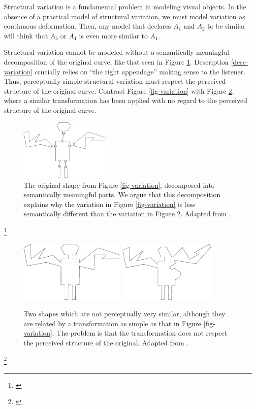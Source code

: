 Structural variation is a fundamental problem in modeling visual
objects. In the absence of a practical model of structural variation,
we must model variation as continuous deformation. Then, any model
that declares $A_1$ and $A_2$ to be similar will think that $A_3$ or
$A_4$ is even more similar to $A_1$.

Structural variation cannot be modeled without a semantically
meaningful decomposition of the original curve, like that seen in
Figure \ref{fig-variation-decompose}. Description \ref{desc-variation}
crucially relies on ``the right appendage'' making sense to the
listener. Thus, perceptually simple structural variation must respect
the perceived structure of the original curve. Contrast Figure
\ref{fig-variation} with Figure \ref{fig-badvariation}, where a
similar transformation has been applied with no regard to the
perceived structure of the original curve.

\begin{figure}[h]
\centering
\includegraphics[height=30mm]{images/basri_decomposed.png} 
\caption{The original shape from Figure \ref{fig-variation},
  decomposed into semantically meaningful parts. We argue that this
  decomposition explains why the variation in Figure
  \ref{fig-variation} is less semantically different than the
  variation in Figure \ref{fig-badvariation}. Adapted from
.}
\label{fig-variation-decompose}
\end{figure}
\footnote{\cite{basri-jacobs}}

\begin{figure}[h]
\centering
\includegraphics[height=30mm]{images/basri_original.png} 
\includegraphics[height=30mm]{images/basri_variation_bad.png} 
\caption{Two shapes which are not perceptually very similar, although
  they are related by a transformation as simple as that in Figure
  \ref{fig-variation}. The problem is that the transformation does not
  respect the perceived structure of the original. Adapted from
  .}
\label{fig-badvariation}
\end{figure}
\footnote{\cite{basri-jacobs}}

